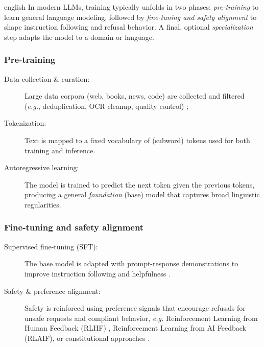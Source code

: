 \begin{otherlanguage*}{english}
In modern LLMs, training typically unfolds in two phases: \emph{pre-training} to learn general language modeling, followed by \emph{fine-tuning and safety alignment} to shape instruction following and refusal behavior. A final, optional \emph{specialization} step adapts the model to a domain or language.

\subsubsection{Pre-training}
\begin{description}
  \item[Data collection \& curation:] Large data corpora (web, books, news, code) are collected and filtered (\textit{e.g.}, deduplication, OCR cleanup, quality control) \cite{duSurveyLLMDatasets2024};
  \item[Tokenization:] Text is mapped to a fixed vocabulary of (subword) tokens used for both training and inference.
  \item[Autoregressive learning:] The model is trained to predict the next token given the previous tokens, producing a general \emph{foundation} (base) model that captures broad linguistic regularities.
\end{description}

\subsubsection{Fine-tuning and safety alignment}
\begin{description}
  \item[Supervised fine-tuning (SFT):] The base model is adapted with prompt-response demonstrations to improve instruction following and helpfulness \cite{ouyangTrainingLanguageModels2022}.
  \item[Safety \& preference alignment:] Safety is reinforced using preference signals that encourage refusals for unsafe requests and compliant behavior, \textit{e.g.} Reinforcement Learning from Human Feedback (RLHF) \cite{baiTrainingHelpfulHarmless2022}, Reinforcement Learning from AI Feedback (RLAIF), or constitutional approaches \cite{baiConstitutionalAIHarmlessness2022}.
\end{description}


\end{otherlanguage*}
